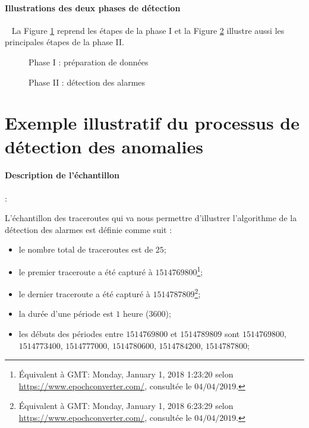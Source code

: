 \paragraph{ Illustrations des deux phases de détection}~
La Figure  \ref{fig:step-preparing-data} reprend les étapes de la phase I et
la Figure \ref{fig:step-detection-anomalies} illustre aussi les principales étapes  de la phase II.
\newpage

\begin{figure}[H]
	\centering
	\captionsetup{justification=centering}
	\resizebox{!}{\textheight}{
		
	}
	\caption{Phase I : préparation de données }
	\label{fig:step-preparing-data}
\end{figure}

\begin{figure}[H]
	\centering
	\captionsetup{justification=centering}
	\resizebox{\textwidth}{\textheight}{
		
	}
	\caption{Phase II : détection des alarmes }
	\label{fig:step-detection-anomalies}
\end{figure}



\section{Exemple illustratif du processus de détection des anomalies}

\paragraph{Description de  l'échantillon} :

L'échantillon des traceroutes qui va nous permettre d'illustrer l'algorithme de la détection des alarmes est définie comme suit :

\begin{itemize}
	\item le nombre total de traceroutes est de $25$;
	\item le premier traceroute a été capturé à $1514769800$\footnote{Équivalent à GMT: Monday, January 1, 2018 1:23:20 selon \url{https://www.epochconverter.com/}, consultée le $04/04/2019$.};
	\item le dernier traceroute a été capturé à $1514787809$\footnote{Équivalent à GMT: Monday, January 1, 2018 6:23:29 selon \url{https://www.epochconverter.com/}, consultée le $04/04/2019$.};
	\item la durée d'une période est $1$ heure ($3600$);
	\item les débuts des périodes entre $ 1514769800 $ et $ 1514789809 $ sont  $ 1514769800 $, $ 1514773400 $, $ 1514777000 $, $ 1514780600 $, $ 1514784200 $, $ 1514787800 $;
\end{itemize} 



